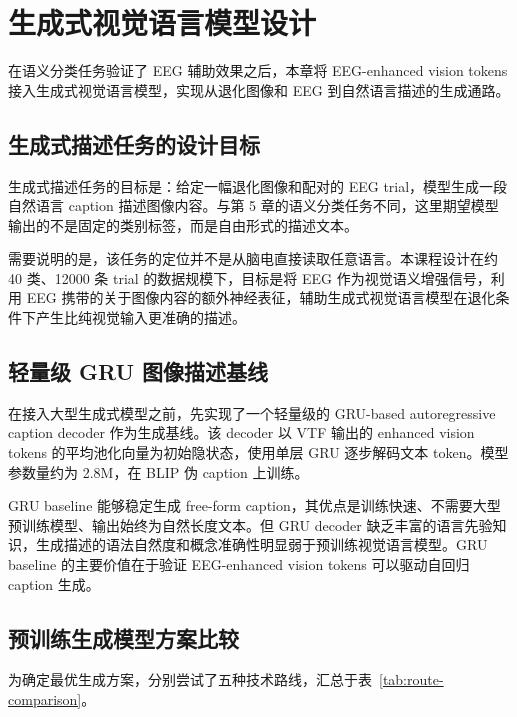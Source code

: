\section{生成式视觉语言模型设计}

在语义分类任务验证了 EEG 辅助效果之后，本章将 EEG-enhanced vision tokens 接入生成式视觉语言模型，实现从退化图像和 EEG 到自然语言描述的生成通路。

\subsection{生成式描述任务的设计目标}

生成式描述任务的目标是：给定一幅退化图像和配对的 EEG trial，模型生成一段自然语言 caption 描述图像内容。与第 5 章的语义分类任务不同，这里期望模型输出的不是固定的类别标签，而是自由形式的描述文本。

需要说明的是，该任务的定位并不是从脑电直接读取任意语言。本课程设计在约 40 类、12000 条 trial 的数据规模下，目标是将 EEG 作为视觉语义增强信号，利用 EEG 携带的关于图像内容的额外神经表征，辅助生成式视觉语言模型在退化条件下产生比纯视觉输入更准确的描述。

\subsection{轻量级 GRU 图像描述基线}

在接入大型生成式模型之前，先实现了一个轻量级的 GRU-based autoregressive caption decoder 作为生成基线。该 decoder 以 VTF 输出的 enhanced vision tokens 的平均池化向量为初始隐状态，使用单层 GRU 逐步解码文本 token。模型参数量约为 2.8M，在 BLIP 伪 caption 上训练。

GRU baseline 能够稳定生成 free-form caption，其优点是训练快速、不需要大型预训练模型、输出始终为自然长度文本。但 GRU decoder 缺乏丰富的语言先验知识，生成描述的语法自然度和概念准确性明显弱于预训练视觉语言模型。GRU baseline 的主要价值在于验证 EEG-enhanced vision tokens 可以驱动自回归 caption 生成。

\subsection{预训练生成模型方案比较}

为确定最优生成方案，分别尝试了五种技术路线，汇总于表~\ref{tab:route-comparison}。


